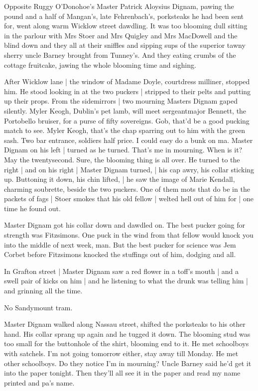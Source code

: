 Opposite Ruggy O'Donohoe's
Master Patrick Aloysius Dignam,
pawing the pound and a half of Mangan's,
late Fehrenbach's,
porksteaks he
had been sent for,
went along warm Wicklow street dawdling.
It was too
blooming dull sitting in the parlour
with Mrs Stoer and Mrs Quigley and
Mrs MacDowell
and the blind down
and they all at their sniffles
and
sipping sups of the superior tawny sherry
uncle Barney brought from
Tunney's.
And they eating crumbs of the cottage fruitcake,
jawing the
whole blooming time and sighing.

After Wicklow lane |
the window of Madame Doyle, courtdress milliner,
stopped him.
He stood looking in at the two puckers |
stripped to their pelts and putting up their props.
From the sidemirrors |
two mourning Masters Dignam gaped silently.
Myler Keogh, Dublin's pet lamb,
will meet sergeantmajor Bennett, the Portobello bruiser,
for a purse of fifty sovereigns.
Gob, that'd be a good pucking match to see.
Myler Keogh, that's the chap sparring out to him with the green sash.
Two bar entrance, soldiers half price.
I could easy do a bunk on ma.
Master Dignam on his left |
turned as he turned.
That's me in mourning.
When is it?
May the twentysecond.
Sure, the blooming thing is all over.
He turned to the right |
and on his right |
Master Dignam turned, |
his cap awry, his collar sticking up.
Buttoning it down, his chin lifted, |
he saw the image of Marie Kendall, charming soubrette,
beside the two puckers.
One of them mots that do be in the packets of fags |
Stoer smokes that his old fellow |
welted hell out of him for |
one time he found out.

Master Dignam got his collar down and dawdled on.
The best pucker
going for strength was Fitzsimons.
One puck in the wind from that fellow
would knock you into the middle of next week, man.
But the best pucker
for science
was Jem Corbet
before Fitzsimons knocked the stuffings out of
him,
dodging and all.

In Grafton street |
Master Dignam saw a red flower in a toff's mouth |
and a swell pair of kicks on him |
and he listening to what the drunk was telling him |
and grinning all the time.

No Sandymount tram.

Master Dignam walked along Nassau street,
shifted the porksteaks to his other hand.
His collar sprang up again and he tugged it down.
The blooming stud was too small for the buttonhole of the shirt,
blooming end to it.
He met schoolboys with satchels.
I'm not going tomorrow either,
stay away till Monday.
He met other schoolboys.
Do they notice I'm in mourning?
Uncle Barney said he'd get it into the paper tonight.
Then they'll all see it in the paper
and read my name printed and pa's name.

